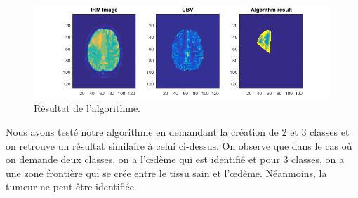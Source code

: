 \begin{figure}[H]
\centering
    \includegraphics[scale=0.8,angle=0]{Images/Patient2Result.png}
    \caption{Résultat de l'algorithme.}
    \label{fig:patient4IRMResult}
\end{figure}

Nous avons testé notre algorithme en demandant la création de 2 et 3 classes et on retrouve un résultat similaire à celui ci-dessus. On observe que dans le cas où on demande deux classes, on a l'œdème qui est identifié et pour 3 classes, on a une zone frontière qui se crée entre le tissu sain et l'œdème. Néanmoins, la tumeur ne peut être identifiée.

